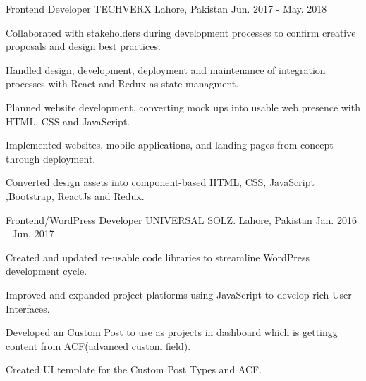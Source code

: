 

\begin{cventries}

  \cventry
    {Frontend Developer} %
    {TECHVERX} %
    {Lahore, Pakistan} %
    {Jun. 2017 - May. 2018} %
    {
      \begin{cvitems} %
        \item {Collaborated with stakeholders during development processes to confirm creative proposals and design best practices.}
        \item {Handled design, development, deployment and maintenance of integration processes with React and Redux as state managment.}
        \item {Planned website development, converting mock ups into usable web presence with HTML, CSS and JavaScript.}
        \item {Implemented websites, mobile applications, and landing pages from concept through deployment.}
        \item {Converted design assets into component-based HTML, CSS, JavaScript ,Bootstrap, ReactJs and Redux.}
      \end{cvitems}
    }

  \cventry
    {Frontend/WordPress Developer} %
    {UNIVERSAL SOLZ.} %
    {Lahore, Pakistan} %
    {Jan. 2016 - Jun. 2017} %
    {
      \begin{cvitems} %
        \item {Created and updated re-usable code libraries to streamline WordPress development cycle.}
        \item {Improved and expanded project platforms using JavaScript to develop rich User Interfaces.}
        \item {Developed an Custom Post to use as projects in dashboard which is gettingg content from ACF(advanced custom field).}
        \item {Created UI template for the Custom Post Types and ACF.}
      \end{cvitems}
    }


\end{cventries}
